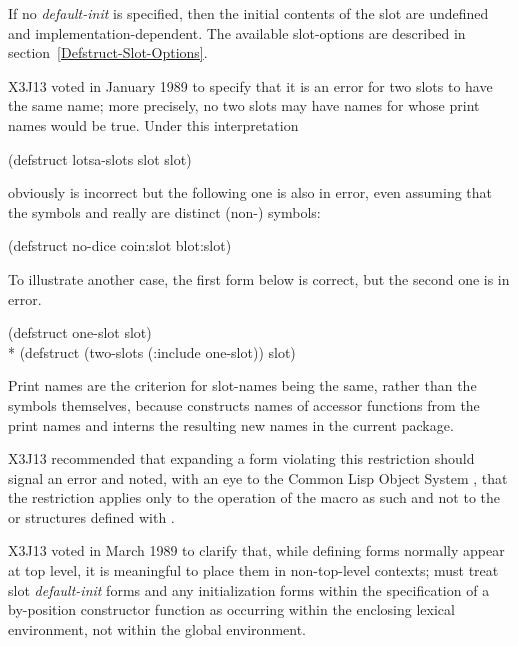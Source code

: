 \begin{defmac}
If no \emph{default-init}
is specified, then the initial contents of the slot are undefined
and implementation-dependent.  The available slot-options are
described in section~\ref{Defstruct-Slot-Options}.

\begin{new}
X3J13 voted in January 1989
to specify that it is an error for
two slots to have the same name; more precisely, no two slots may
have names for whose print names  would be true.
Under this interpretation
\begin{lisp}
(defstruct lotsa-slots slot slot)
\end{lisp}
obviously is incorrect
but the following one is also in error, even assuming that the symbols
 and  really are distinct (non-) symbols:
\begin{lisp}
(defstruct no-dice coin:slot blot:slot)
\end{lisp}
To illustrate another case, the first  form below is
correct, but the second one is in error.
\begin{lisp}
(defstruct one-slot slot) \\*
(defstruct (two-slots (:include one-slot)) slot)
\end{lisp}

\beforenoterule
\begin{rationale}
Print names are the criterion for slot-names being the same, rather
than the symbols themselves, because  constructs names
of accessor functions from the print names and interns the resulting
new names in the current package.
\end{rationale}
\afternoterule

X3J13 recommended that expanding
a  form violating this
restriction should signal an error and noted, with an eye to the Common Lisp
Object System
, that the restriction applies only to the operation of the
 macro as such and not to the  or
structures defined with .
\end{new}

\begin{newer}
X3J13 voted in March 1989 
to clarify that, while defining forms normally appear at top level,
it is meaningful to place them in non-top-level contexts;
 must treat slot \emph{default-init} forms
and any
initialization forms within the specification of a by-position
constructor function as occurring
within the enclosing lexical environment, not within the global
environment.
\end{newer}


\end{defmac}
